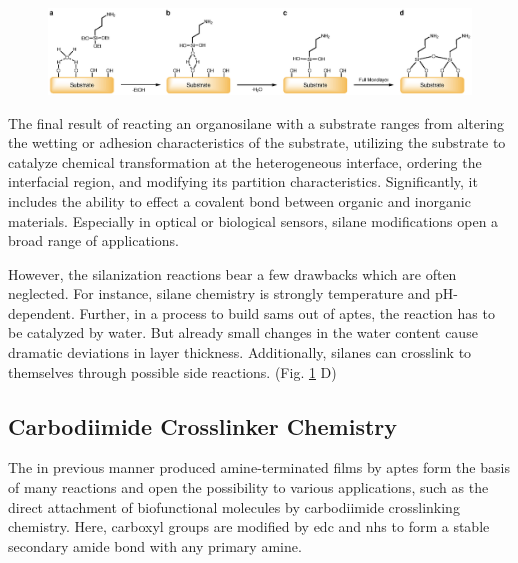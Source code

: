 \begin{figure}[h]
	\centering
	\includegraphics[width=1\linewidth]{./Ressources/Chemistry/APTES.eps}
	\label{fig:chem:APTES}
\end{figure}

The final result of reacting an organosilane with a substrate ranges from altering the wetting or adhesion characteristics of the substrate, utilizing the substrate to catalyze chemical transformation at the heterogeneous interface, ordering the interfacial region, and modifying its partition characteristics. Significantly, it includes the ability to effect a covalent bond between organic and inorganic materials. Especially in optical or biological sensors, silane modifications open a broad range of applications. 

However, the silanization reactions bear a few drawbacks which are often neglected. For instance, silane chemistry is strongly temperature and pH-dependent. \cite{lit:chem:silaizationTemp,lit:chem:silanizationParameters} Further, in a process to build \glspl{sam} out of \gls{aptes}, the reaction has to be catalyzed by water. But already small changes in the water content cause dramatic deviations in layer thickness. \cite{lit:chem:sin:selectivemod} Additionally, silanes can crosslink to themselves through possible side reactions. (Fig. \ref{fig:chem:APTES} D) \cite{lit:chem:aptes:Crosslink}



\subsection{Carbodiimide Crosslinker Chemistry}
The in previous manner produced \gls{amine}-terminated films by \gls{aptes} form the basis of many reactions and open the possibility to various applications, such as the direct attachment of biofunctional molecules by carbodiimide crosslinking chemistry.\cite{lit:bio:BioconjugateTechniques} Here, \gls{carboxyl} groups are modified by \gls{edc} and \gls{nhs} to form a stable secondary \gls{amide} bond with any primary \gls{amine}.

